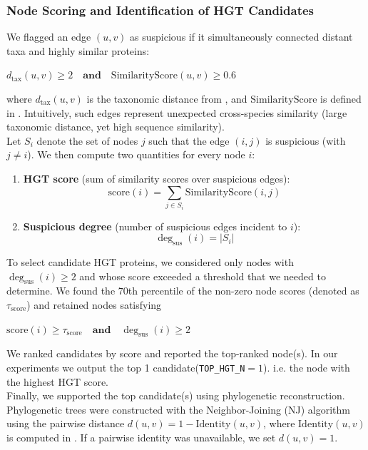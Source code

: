 \documentclass[11pt]{article}
\begin{document}
	\subsubsection[step 4]{Node Scoring and Identification of HGT Candidates}
	\label{subsubsec:step4}
	We flagged an edge $(u,v)$ as suspicious if it simultaneously connected distant taxa and highly similar proteins:
	\begin{center}
		$d_{\text{tax}}(u,v) \ge 2
		\quad\textbf{and}\quad
		\mathrm{SimilarityScore}(u,v) \ge 0.6$
	\end{center}
	where $d_{\text{tax}}(u,v)$ is the taxonomic distance from , and $\mathrm{SimilarityScore}$ is defined in .
	Intuitively, such edges represent unexpected cross-species similarity (large taxonomic distance, yet high sequence similarity).\\
	Let $S_i$ denote the set of nodes $j$ such that the edge $(i,j)$ is suspicious (with $j \neq i$).
	We then compute two quantities for every node $i$:
	\begin{enumerate}[noitemsep]
		\item \textbf{HGT score} (sum of similarity scores over suspicious edges):
		{\setlength{\abovedisplayskip}{4pt}
			\setlength{\belowdisplayskip}{4pt}
			\begin{equation*}
				\mathrm{score}(i) = \sum_{j \in S_i} \mathrm{SimilarityScore}(i,j)
			\end{equation*}
		}
		\item \textbf{Suspicious degree} (number of suspicious edges incident to $i$):
		{\setlength{\abovedisplayskip}{4pt}
			\setlength{\belowdisplayskip}{4pt}
			\begin{equation*}
				\deg_{\text{sus}}(i) = |S_i|
			\end{equation*}
		}
	\end{enumerate}
	To select candidate HGT proteins, we considered only nodes with $\deg_{\text{sus}}(i)\ge 2$ and whose score exceeded a threshold that we needed to determine.
	We found the $70$th percentile of the non-zero node scores (denoted as $\tau_{\text{score}}$) and retained nodes satisfying 
	\begin{center}
		$\mathrm{score}(i)\ge \tau_{\text{score}}
		\quad\textbf{and}\quad
		\deg_{\text{sus}}(i)\ge 2$
	\end{center}
	We ranked candidates by score and reported the top-ranked node(s). In our experiments we output the top 1 candidate(\texttt{TOP\_HGT\_N}$=1$). i.e. the node with the highest HGT score.\\
	Finally, we supported the top candidate(s) using phylogenetic reconstruction.
	Phylogenetic trees were constructed with the Neighbor-Joining (NJ) algorithm \cite{NJ} using the pairwise distance $d(u,v)=1-\mathrm{Identity}(u,v)$, where $\mathrm{Identity}(u,v)$ is computed in . If a pairwise identity was unavailable, we set $d(u,v)=1$.
	
\end{document}
